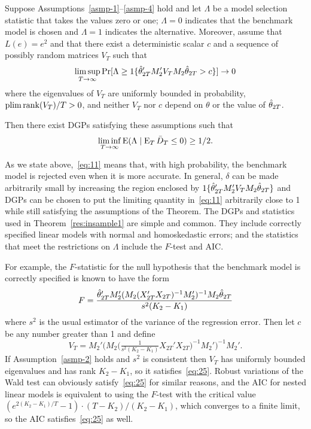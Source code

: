 \documentclass[12pt,draft]{article}
\begin{document}
\begin{thm}\label{res:insample1}
  Suppose Assumptions~\ref{asmp-1}--\ref{asmp-4} hold and let
  $\Lambda$ be a model selection statistic that takes the values zero
  or one; $\Lambda = 0$ indicates that the benchmark model is chosen
  and $\Lambda = 1$ indicates the alternative.  Moreover, assume that
  $L(e) = e^2$ and that there exist a deterministic scalar $c$
  and a sequence of possibly random matrices $V_T$ such that
  \begin{equation}\label{eq:25}
    \limsup_{T \to \infty}
    \Pr[\Lambda \geq \operatorname{1}\{\hat\theta_{2T}'M_2' V_T M_2\hat\theta_{2T} > c \}]
    \to 0
  \end{equation}
  where the eigenvalues of $V_T$ are uniformly bounded in probability,
  $\operatorname*{plim} \operatorname*{rank}(V_T)/T > 0$, and neither $V_T$ nor $c$ depend on
  $\theta$ or the value of $\hat\theta_{2T}$.

  Then there exist DGPs satisfying these assumptions such that
  \begin{equation}\label{eq:11}
    \liminf_{T \to \infty} \operatorname{E}( \Lambda \mid \operatorname{E}_T \bar{D}_{T} \leq 0 ) \geq 1/2.
  \end{equation}
\end{thm}

As we state above,~\eqref{eq:11} means that, with high probability,
the benchmark model is rejected even when it is more accurate. In
general, $\delta$ can be made arbitrarily small by increasing the
region enclosed by $\operatorname{1}\{\hat\theta_{2T}'M_2' V_T M_2\hat\theta_{2T}\}$ and DGPs can be
chosen to put the limiting quantity in~\eqref{eq:11}
arbitrarily close to 1 while still satisfying
the assumptions of the Theorem.  The DGPs and
statistics used in Theorem~\ref{res:insample1} are simple and
common. They include correctly specified linear models with normal and
homoskedastic errors; and the statistics that meet the restrictions on
$\Lambda$ include the $F$-test and AIC.

For example, the $F$-statistic for the null hypothesis that the
benchmark model is correctly specified is known to have the form
\begin{equation*}
  F = \frac{\hat\theta_{2T}' M_2' ( M_2 (X_{2T}'X_{2T})^{-1} M_2' )^{-1} M_2
    \hat\theta_{2T}}{s^2 (K_2 - K_1)}
\end{equation*}
where $s^2$ is the usual estimator of the variance of the regression
error. Then let $c$ be any number greater than 1 and define
\begin{equation*}
  V_T = M_2' \big( M_2 \big(\tfrac{1}{s^2 (K_2 - K_1)} X_{2T}'X_{2T}\big)^{-1}
  M_2' \big)^{-1} M_2'.
\end{equation*}
If Assumption~\ref{asmp-2} holds and $s^2$ is consistent then $V_T$
has uniformly bounded eigenvalues and has rank $K_2 - K_1$, so it
satisfies~\eqref{eq:25}.
Robust variations of the Wald test can obviously satisfy~\eqref{eq:25}
for similar reasons, and the AIC for nested linear models is
equivalent to using the $F$-test with the critical value %
$(e^{2 (K_2 - K_1) / T} - 1) \cdot (T - K_2) / (K_2 - K_1)$, %
which converges to a finite limit, so the AIC satisfies~\eqref{eq:25}
as well.
\end{document}
